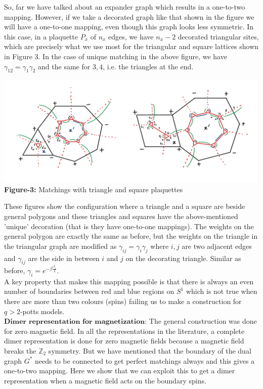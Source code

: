 \documentclass{article}
\begin{document}
	So, far we have talked about an expander graph which results in a one-to-two mapping. However, if we take a decorated graph like that shown in the figure we will have a one-to-one mapping, even though this graph looks less symmetric. In this case, in a plaquette $P_x$ of $n_x$ edges, we have $n_x-2$ decorated triangular sites, which are precisely what we use most for the triangular and square lattices shown in Figure 3. In the case of unique matching in the above figure, we have $\gamma_{12}=\gamma_1\gamma_2$ and the same for $3,4$, i.e. the triangles at the end.
	
	\begin{center}
		\includegraphics[scale=0.2]{Two configurations.jpg} \\
		\textbf{Figure-3:} Matchings with triangle and square plaquettes
	\end{center}
	
	These figures show the configuration where a triangle and a square are beside general polygons and these triangles and squares have the above-mentioned 'unique' decoration (that is they have one-to-one mappings). The weights on the general polygon are exactly the same as before, but the weights on the triangle in the triangular graph are modified as $\gamma_{ij}=\gamma_{i}\gamma_{j}$ where $i,j$ are two adjacent edges and $\gamma_{ij}$ are the side in between $i$ and $j$ on the decorating triangle. Similar as before, $\gamma_i=e^{-\beta \frac{J_i}{2}}$.\\
	
	A key property that makes this mapping possible is that there is always an even number of boundaries between red and blue regions on $S^1$ which is not true when there are more than two colours (spins) failing us to make a construction for $q>2$-potts models. \\
	
	$\textbf{Dimer representation for magnetization:}$ The general construction was done for zero magnetic field. In all the representations in the literature, a complete dimer representation is done for zero magnetic fields because a magnetic field breaks the $\mathbb Z_2$ symmetry. But we have mentioned that the boundary of the dual graph $G^*$ needs to be connected to get perfect matchings always and this gives a one-to-two mapping. Here we show that we can exploit this to get a dimer representation when a magnetic field acts on the boundary spins. \\
	
\end{document}
